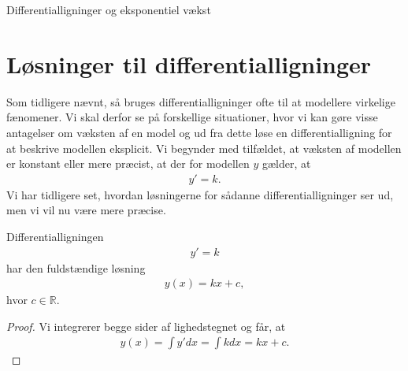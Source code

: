 \begin{center}
\Huge
Differentialligninger og eksponentiel vækst
\end{center}


\section*{Løsninger til differentialligninger}

Som tidligere nævnt, så bruges differentialligninger ofte til at modellere virkelige fænomener. Vi skal derfor se på forskellige situationer, hvor vi kan gøre visse antagelser om væksten af en model og ud fra dette løse en differentialligning for at beskrive modellen eksplicit. Vi begynder med tilfældet, at væksten af modellen er konstant eller mere præcist, at der for modellen $y$ gælder, at
\begin{align*}
	y' = k.
\end{align*}
Vi har tidligere set, hvordan løsningerne for sådanne differentialligninger ser ud, men vi vil nu være mere præcise.
\begin{setn}
	Differentialligningen 
	\begin{align*}
		y' = k
	\end{align*}
	har den fuldstændige løsning
	\begin{align*}
		y(x) = kx + c,
	\end{align*}
	hvor $c \in \mathbb{R}$. 
\end{setn}
\begin{proof}
	Vi integrerer begge sider af lighedstegnet og får, at 
	\begin{align*}
		y(x) = \int y' d x = \int k d x = kx + c.
	\end{align*}
\end{proof}

